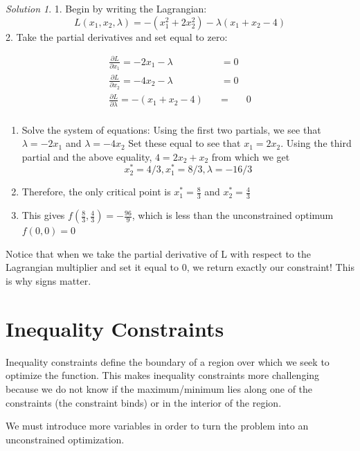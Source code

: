 \documentclass[
]{book}
\theoremstyle{definition}
\theoremstyle{definition}
\theoremstyle{definition}
\theoremstyle{definition}
\theoremstyle{remark}
\newtheorem*{solution}{Solution}
\begin{document}
\begin{solution}
{}
1. Begin by writing the Lagrangian:
\[L(x_1, x_2, \lambda) =  -(x_1^2 + 2x_2^2) - \lambda(x_1 + x_2 - 4)\]
2. Take the partial derivatives and set equal to zero:

\begin{align*}
\frac{\partial L}{\partial x_1} = -2x_1 - \lambda \quad \quad \quad &= 0\\
\frac{\partial L}{\partial x_2}  = -4x_2 - \lambda \quad \quad \quad &= 0\\
\frac{\partial L}{\partial \lambda} = -(x_1 + x_2 - 4) \quad & = & 0\\
\end{align*}

\begin{enumerate}
\def\labelenumi{\arabic{enumi}.}
\setcounter{enumi}{2}
\item
  Solve the system of equations: Using the first two partials, we see that \(\lambda = -2x_1\) and \(\lambda = -4x_2\)
  Set these equal to see that \(x_1 = 2x_2\).
  Using the third partial and the above equality, \(4 = 2x_2 + x_2\) from which we get \[x_2^* = 4/3, x_1^* = 8/3, \lambda = -16/3\]
\item
  Therefore, the only critical point is \(x_1^* = \frac{8}{3}\) and \(x_2^* = \frac{4}{3}\)
\item
  This gives \(f(\frac{8}{3}, \frac{4}{3}) = -\frac{96}{9}\), which is less than the unconstrained optimum \(f(0,0) = 0\)
\end{enumerate}
\end{solution}

Notice that when we take the partial derivative of L with respect to the Lagrangian multiplier and set it equal to 0, we return exactly our constraint! This is why signs matter.

\hypertarget{inequality-constraints}{%
\section{Inequality Constraints}\label{inequality-constraints}}

Inequality constraints define the boundary of a region over which we seek to optimize the function. This makes inequality constraints more challenging because we do not know if the maximum/minimum lies along one of the constraints (the constraint binds) or in the interior of the region.

We must introduce more variables in order to turn the problem into an unconstrained optimization.
\end{document}
